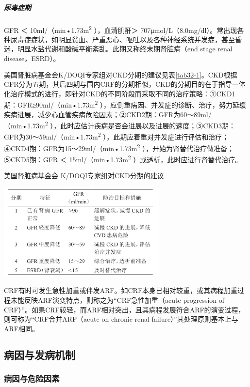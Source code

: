 \subparagraph{尿毒症期}

GFR ＜ 10ml/（min•1.73m\textsuperscript{2} ），血清肌酐＞
707μmol/L（8.0mg/dl）。常出现各种尿毒症症状，如明显贫血、严重恶心、呕吐以及各种神经系统并发症，甚至昏迷，明显水盐代谢和酸碱平衡紊乱。此期又称终末期肾脏病（end
stage renal disease，ESRD）。

美国肾脏病基金会K/DOQI专家组对CKD分期的建议见表\ref{tab32-1}。CKD根据GFR分为五期，其后四期与国内CRF的分期相似，CKD的分期目的在于指导一体化治疗模式的进行，即针对CKD的不同阶段而采取不同的治疗策略：①CKD1期：GFR≥90ml/（min•1.73m\textsuperscript{2}
），应侧重病因、并发症的诊断、治疗，努力延缓疾病进展，减少心血管疾病危险因素；②CKD2期：GFR为60～89ml/（min•1.73m\textsuperscript{2}
），此时应估计疾病是否会进展以及进展的速度；③CKD3期：GFR为30～59ml/（min•1.73m\textsuperscript{2}
），此期应着重对并发症进行评估和治疗；④CKD4期：GFR为15～29ml/（min•1.73m\textsuperscript{2}
），开始为肾替代治疗做准备；⑤CKD5期：GFR ＜
15ml/（min•1.73m\textsuperscript{2} ）或透析，此时应进行肾替代治疗。

\begin{table}[htbp]
\centering
\caption{美国肾脏病基金会 K/DOQI专家组对CKD分期的建议}
\label{tab32-1}
\includegraphics[width=3.33333in,height=1.92708in]{./images/Image00121.jpg}
\end{table}

CRF有时可发生急性加重或伴发ARF。如CRF本身已相对较重，或其病程加重过程未能反映ARF演变特点，则称之为“CRF急性加重（acute
progression of
CRF）”。如果CRF较轻，而ARF相对突出，且其病程发展符合ARF的演变过程，则可称为“CRF合并ARF（acute
on chronic renal failure）”其处理原则基本上与ARF相同。

\subsection{病因与发病机制}

\subsubsection{病因与危险因素}

